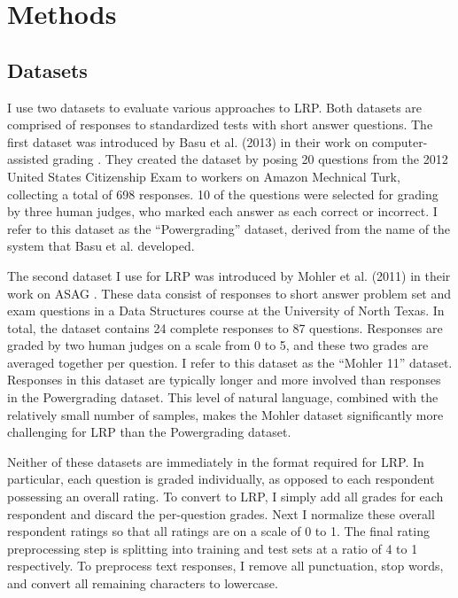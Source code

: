 \section{Methods}
\subsection{Datasets}
I use two datasets to evaluate various approaches to LRP. Both datasets are comprised of responses to standardized tests with short answer questions. The first dataset was introduced by Basu et al. (2013) in their work on computer-assisted grading \cite{basu2013powergrading}. They created the dataset by posing 20 questions from the 2012 United States Citizenship Exam to workers on Amazon Mechnical Turk, collecting a total of 698 responses. 10 of the questions were selected for grading by three human judges, who marked each answer as each correct or incorrect. I refer to this dataset as the ``Powergrading'' dataset, derived from the name of the system that Basu et al. developed.

The second dataset I use for LRP was introduced by Mohler et al. (2011) in their work on ASAG \cite{mohler2011learning}. These data consist of responses to short answer problem set and exam questions in a Data Structures course at the University of North Texas. In total, the dataset contains 24 complete responses to 87 questions. Responses are graded by two human judges on a scale from 0 to 5, and these two grades are averaged together per question. I refer to this dataset as the ``Mohler 11'' dataset. Responses in this dataset are typically longer and more involved than responses in the Powergrading dataset. This level of natural language, combined with the relatively small number of samples, makes the Mohler dataset significantly more challenging for LRP than the Powergrading dataset.

Neither of these datasets are immediately in the format required for LRP. In particular, each question is graded individually, as opposed to each respondent possessing an overall rating. To convert to LRP, I simply add all grades for each respondent and discard the per-question grades. Next I normalize these overall respondent ratings so that all ratings are on a scale of 0 to 1. The final rating preprocessing step is splitting into training and test sets at a ratio of 4 to 1 respectively. To preprocess text responses, I remove all punctuation, stop words, and convert all remaining characters to lowercase.

